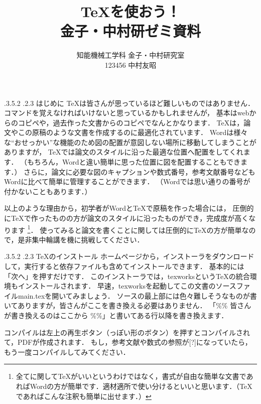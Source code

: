 \documentclass[twocolumn,a4j]{jarticle}
\title{\TeX を使おう！\\		%
{\small 金子・中村研ゼミ資料}	%
}
\author{知能機械工学科 金子・中村研究室\\123456 中村友昭} %
\date{}
\makeatletter
\renewcommand{\section}{\@startsection{section}{1}{\z@}%
   {.3\Cvs \@plus.5\Cvs \@minus.2\Cvs}%
   {.2\Cvs \@plus.3\Cvs}%
   {\reset@font\Large\bfseries}}         %
\makeatother
\begin{document}
\maketitle

\renewcommand{\headrulewidth}{0.0pt}
\thispagestyle{fancy}
\lhead{}
\cfoot{\thepage{}}




\section{はじめに}
TeXは皆さんが思っているほど難しいものではありません．
コマンドを覚えなければいけないと思っているかもしれませんが，
基本はwebからのコピペや，過去作った文書からのコピペでなんとかなります．
TeXは，論文やこの原稿のような文書を作成するのに最適化されています．
Wordは様々な``おせっかい''な機能のため図の配置が意図しない場所に移動してしまうことがありますが，
TeXでは論文のスタイルに沿った最適な位置へ配置をしてくれます．
（もちろん，Wordと違い簡単に思った位置に図を配置することもできます．）
さらに，論文に必要な図のキャプションや数式番号，参考文献番号などもWordに比べて簡単に管理することができます．
（Wordでは思い通りの番号が付かないこともあります．）

以上のような理由から，初学者がWordとTeXで原稿を作った場合には，
圧倒的にTeXで作ったものの方が論文のスタイルに沿ったものができ，完成度が高くなります
\footnote{全てに関してTeXがいいというわけではなく，書式が自由な簡単な文書であればWordの方が簡単です．適材適所で使い分けるといいと思います．（TeXであればこんな注釈も簡単に出せます．）}．
使ってみると論文を書くことに関しては圧倒的にTeXの方が簡単なので，是非集中輪講を機に挑戦してください．


\section{ \TeX のインストール}
ホームページ\cite{tex}から，インストーラをダウンロードして，実行すると依存ファイルも含めてインストールできます．
基本的には「次へ」を押すだけです．
このインストーラでは，texworksというTeXの統合環境もインストールされます．
早速，texworksを起動してこの文書のソースファイルmain.texを開いてみましょう．
ソースの最上部には色々難しそうなものが書いてありますが，皆さんがここを書き換える必要はありません．
「\%\% 皆さんが書き換えるのはここから \%\%」と書いてある行以降を書き換えます．

コンパイルは左上の再生ボタン（っぽい形のボタン）を押すとコンパイルされて，PDFが作成されます．
もし，参考文献や数式の参照が[?]になっていたら，もう一度コンパイルしてみてください．
\end{document}
